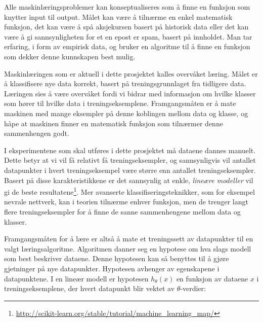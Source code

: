 Alle maskinlæringsproblemer kan konseptualiseres som å finne en funksjon som knytter input til output. Målet kan være å tilnærme en enkel matematisk funksjon, det kan være å spå aksjekursen basert på historisk data eller det kan være å gi sannsynligheten for et en epost er spam, basert på innholdet. Man tar erfaring, i form av empirisk data, og bruker en algoritme til å finne en funksjon som dekker denne kunnskapen best mulig.

Maskinlæringen som er aktuell i dette prosjektet kalles overvåket læring. Målet er å klassifisere nye data korrekt, basert på treningsgrunnlaget fra tidligere data. Læringen sies å være overvåket fordi vi bidrar med informasjon om hvilke klasser som hører til hvilke data i treningseksemplene. Framgangsmåten er å mate maskinen med mange eksempler på denne koblingen mellom data og klasse, og håpe at maskinen finner en matematisk funksjon som tilnærmer denne sammenhengen godt.

I eksperimentene som skal utføres i dette prosjektet må dataene dannes manuelt. Dette betyr at vi vil få relativt få treningseksempler, og sannsynligvis vil antallet datapunkter i hvert treningseksempel være større enn antallet treningseksempler. Basert på disse karakteristikkene er det sannsynlig at enkle, \emph{lineære modeller} vil gi de beste resultatene\footnote{\url{http://scikit-learn.org/stable/tutorial/machine_learning_map/}}. Mer avanserte klassifiseringsteknikker, som for eksempel nevrale nettverk, kan i teorien tilnærme enhver funksjon, men de trenger langt flere treningseksempler for å finne de sanne sammenhengene mellom data og klasser.

Framgangsmåten for å lære er altså å mate et treningssett av datapunkter til en valgt læringsalgoritme. Algoritmen danner seg en hypotese om hva slags modell som best beskriver dataene. Denne hypotesen kan så benyttes til å gjøre gjetninger på nye datapunkter. Hypotesen avhenger av egenskapene i datapunktene. I en lineær modell er hypotesen $h_\theta(x)$ en funksjon av dataene $x$ i treningseksemplene, der hvert datapunkt blir vektet av $\theta$-verdier:

